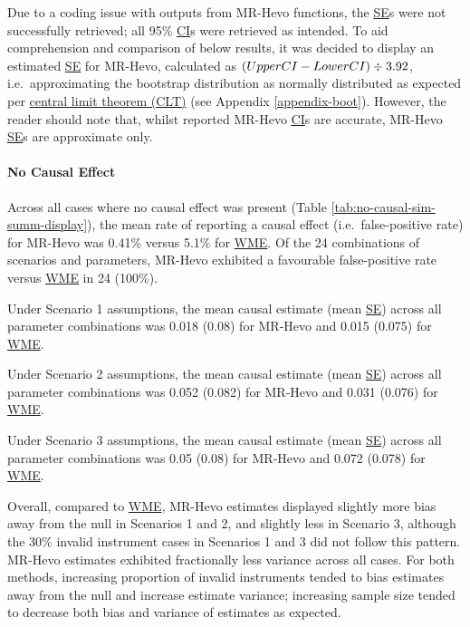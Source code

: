 \documentclass[
]{article}
\begin{document}
Due to a coding issue with outputs from MR-Hevo functions, the \hyperref[acronyms_SE]{SE}s were not successfully retrieved; all 95\% \hyperref[acronyms_CI]{CI}s were retrieved as intended. To aid comprehension and comparison of below results, it was decided to display an estimated \hyperref[acronyms_SE]{SE} for MR-Hevo, calculated as \((Upper \space CI - Lower \space CI) \div 3.92\), i.e.~approximating the bootstrap distribution as normally distributed as expected per \hyperref[acronyms_CLT]{central limit theorem (CLT)} (see Appendix \ref{appendix-boot}). However, the reader should note that, whilst reported MR-Hevo \hyperref[acronyms_CI]{CI}s are accurate, MR-Hevo \hyperref[acronyms_SE]{SE}s are approximate only.

\paragraph{No Causal Effect}\label{results-sim-no-causal}

\leavevmode\newline Across all cases where no causal effect was present (Table \ref{tab:no-causal-sim-summ-display}), the mean rate of reporting a causal effect (i.e.~false-positive rate) for MR-Hevo was 0.41\% versus 5.1\% for \hyperref[acronyms_WME]{WME}. Of the 24 combinations of scenarios and parameters, MR-Hevo exhibited a favourable false-positive rate versus \hyperref[acronyms_WME]{WME} in 24 (100\%).

Under Scenario 1 assumptions, the mean causal estimate (mean \hyperref[acronyms_SE]{SE}) across all parameter combinations was 0.018 (0.08) for MR-Hevo and 0.015 (0.075) for \hyperref[acronyms_WME]{WME}.

Under Scenario 2 assumptions, the mean causal estimate (mean \hyperref[acronyms_SE]{SE}) across all parameter combinations was 0.052 (0.082) for MR-Hevo and 0.031 (0.076) for \hyperref[acronyms_WME]{WME}.

Under Scenario 3 assumptions, the mean causal estimate (mean \hyperref[acronyms_SE]{SE}) across all parameter combinations was 0.05 (0.08) for MR-Hevo and 0.072 (0.078) for \hyperref[acronyms_WME]{WME}.

Overall, compared to \hyperref[acronyms_WME]{WME}, MR-Hevo estimates displayed slightly more bias away from the null in Scenarios 1 and 2, and slightly less in Scenario 3, although the 30\% invalid instrument cases in Scenarios 1 and 3 did not follow this pattern. MR-Hevo estimates exhibited fractionally less variance across all cases. For both methods, increasing proportion of invalid instruments tended to bias estimates away from the null and increase estimate variance; increasing sample size tended to decrease both bias and variance of estimates as expected.
\end{document}

